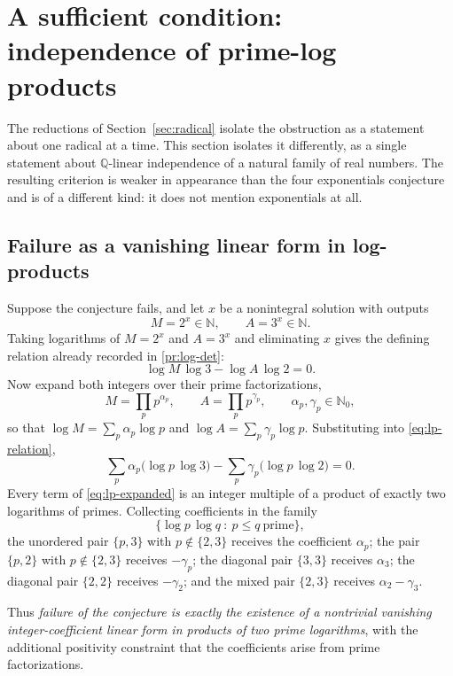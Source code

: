 \documentclass[11pt,oneside]{article}
\theoremstyle{definition}
\theoremstyle{remark}
\newcommand{\N}{\mathbb N}
\newcommand{\Nzero}{\mathbb N_0}
\newcommand{\Q}{\mathbb Q}
\begin{document}
\section{A sufficient condition: independence of prime-log products}
\label{sec:logproduct}

The reductions of Section~\ref{sec:radical} isolate the obstruction as a statement about one
radical at a time.  This section isolates it differently, as a single statement about
$\Q$-linear independence of a natural family of real numbers.  The resulting criterion is
weaker in appearance than the four exponentials conjecture and is of a different kind: it does
not mention exponentials at all.

\subsection{Failure as a vanishing linear form in log-products}

Suppose the conjecture fails, and let $x$ be a nonintegral solution with outputs
\[
  M=2^x\in\N,
  \qquad
  A=3^x\in\N .
\]
Taking logarithms of $M=2^x$ and $A=3^x$ and eliminating $x$ gives the defining relation
already recorded in \eqref{pr:log-det}:
\begin{equation}
  \log M\,\log3-\log A\,\log2=0 .
  \label{eq:lp-relation}
\end{equation}
Now expand both integers over their prime factorizations,
\[
  M=\prod_p p^{\alpha_p},
  \qquad
  A=\prod_p p^{\gamma_p},
  \qquad
  \alpha_p,\gamma_p\in\Nzero,
\]
so that $\log M=\sum_p\alpha_p\log p$ and $\log A=\sum_p\gamma_p\log p$.  Substituting into
\eqref{eq:lp-relation},
\begin{equation}
  \sum_p\alpha_p\bigl(\log p\,\log3\bigr)
  -\sum_p\gamma_p\bigl(\log p\,\log2\bigr)=0 .
  \label{eq:lp-expanded}
\end{equation}
Every term of \eqref{eq:lp-expanded} is an integer multiple of a product of exactly two
logarithms of primes.  Collecting coefficients in the family
\[
  \bigl\{\log p\,\log q\ :\ p\le q\ \text{prime}\bigr\},
\]
the unordered pair $\{p,3\}$ with $p\notin\{2,3\}$ receives the coefficient $\alpha_p$; the
pair $\{p,2\}$ with $p\notin\{2,3\}$ receives $-\gamma_p$; the diagonal pair $\{3,3\}$
receives $\alpha_3$; the diagonal pair $\{2,2\}$ receives $-\gamma_2$; and the mixed pair
$\{2,3\}$ receives $\alpha_2-\gamma_3$.

Thus \emph{failure of the conjecture is exactly the existence of a nontrivial vanishing
integer-coefficient linear form in products of two prime logarithms}, with the additional
positivity constraint that the coefficients arise from prime factorizations.
\end{document}
